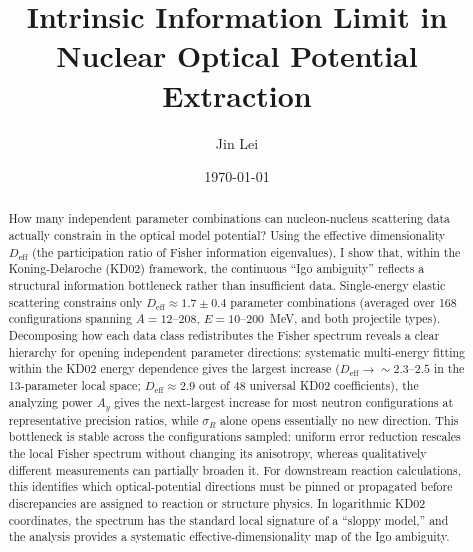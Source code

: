 \documentclass[aps,prl,reprint,superscriptaddress,showpacs,floatfix]{revtex4-2}
\begin{document}
\title{Intrinsic Information Limit in Nuclear Optical Potential Extraction}

\author{Jin Lei}

\date{\today}

\begin{abstract}
How many independent parameter combinations can nucleon-nucleus scattering data actually constrain in the optical model potential? Using the effective dimensionality $D_\mathrm{eff}$ (the participation ratio of Fisher information eigenvalues), I show that, within the Koning-Delaroche (KD02) framework, the continuous ``Igo ambiguity'' reflects a structural information bottleneck rather than insufficient data. Single-energy elastic scattering constrains only $D_\mathrm{eff} \approx 1.7 \pm 0.4$ parameter combinations (averaged over 168 configurations spanning $A = 12$--$208$, $E = 10$--$200$~MeV, and both projectile types). Decomposing how each data class redistributes the Fisher spectrum reveals a clear hierarchy for opening independent parameter directions: systematic multi-energy fitting within the KD02 energy dependence gives the largest increase ($D_\mathrm{eff} \to \sim\!2.3$--$2.5$ in the 13-parameter local space; $D_\mathrm{eff} \approx 2.9$ out of 48 universal KD02 coefficients), the analyzing power $A_y$ gives the next-largest increase for most neutron configurations at representative precision ratios, while $\sigma_R$ alone opens essentially no new direction. This bottleneck is stable across the configurations sampled: uniform error reduction rescales the local Fisher spectrum without changing its anisotropy, whereas qualitatively different measurements can partially broaden it. For downstream reaction calculations, this identifies which optical-potential directions must be pinned or propagated before discrepancies are assigned to reaction or structure physics. In logarithmic KD02 coordinates, the spectrum has the standard local signature of a ``sloppy model,'' and the analysis provides a systematic effective-dimensionality map of the Igo ambiguity.
\end{abstract}


\maketitle
\end{document}
